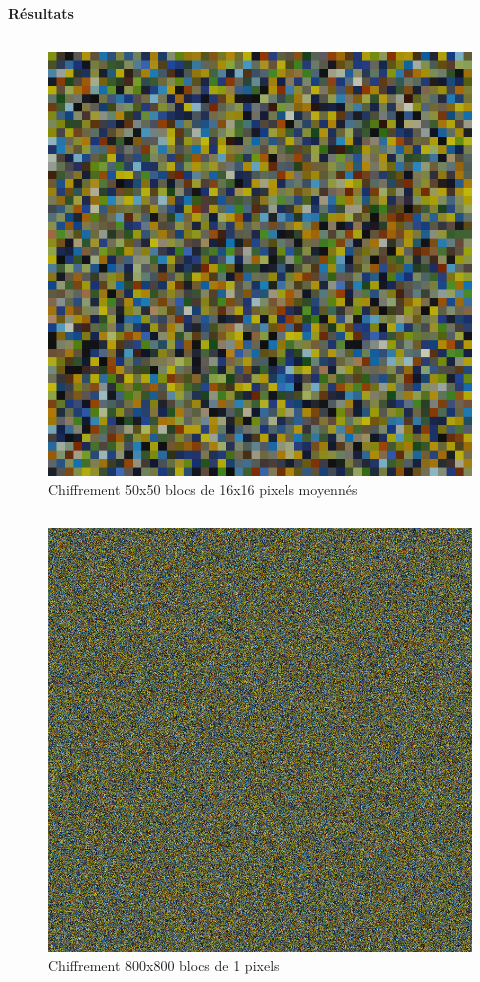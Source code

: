 \documentclass{beamer}
\begin{document}
\begin{frame}[t]
\begin{columns}[t]
\begin{column}{.5\linewidth}
\begin{block}{\centering \textbf{Résultats}}
\begin{columns}[t]
                        \begin{column}{.25\linewidth}
                            \begin{figure}[t]
                                \includegraphics[width=\linewidth]{rsc/van_gogh_a_50_12.png}\\
                                {\small Chiffrement 50x50 blocs de 16x16 pixels moyennés}
                            \end{figure}
                        \end{column}
                    \end{columns}

                    \begin{figure}[t]
                        \includegraphics[width=.25\linewidth]{rsc/van_gogh_800_12.png}\\
                        {\small Chiffrement 800x800 blocs de 1 pixels}
                    \end{figure}
                \end{block}


\end{column}
\end{columns}
\end{frame}
\end{document}

